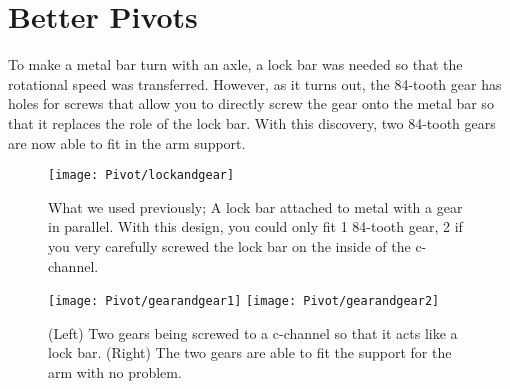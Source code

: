 \section{Better Pivots}

To make a metal bar turn with an axle, a lock bar was needed so that the rotational speed was transferred. However, as it turns out, the 84-tooth gear has holes for screws that allow you to directly screw the gear onto the metal bar so that it replaces the role of the lock bar. With this discovery, two 84-tooth gears are now able to fit in the arm support.

\begin{figure}[h]
    \centering
    \texttt{[image: Pivot/lockandgear]}
    \caption{
        What we used previously; A lock bar attached to metal with a gear in parallel. With this design, you could only fit 1 84-tooth gear, 2 if you very carefully screwed the lock bar on the inside of the c-channel.
    }
\end{figure}

\begin{figure}[h]
    \centering
    \texttt{[image: Pivot/gearandgear1]}
    \texttt{[image: Pivot/gearandgear2]}
    \caption{
        (Left) Two gears being screwed to a c-channel so that it acts like a lock bar. (Right) The two gears are able to fit the support for the arm with no problem.
    }
\end{figure}

